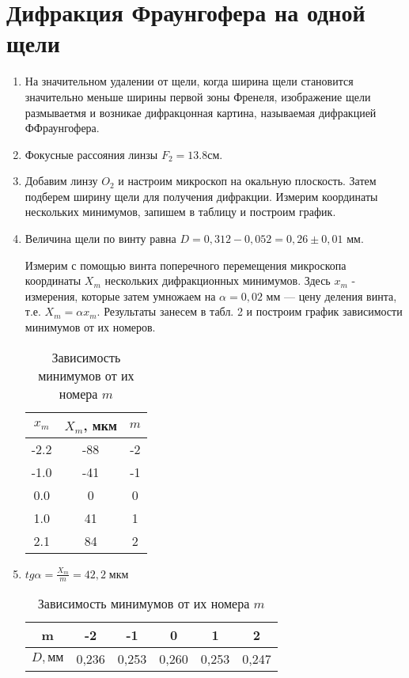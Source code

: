 \documentclass[a4paper]{article}
\begin{document}
\section{Дифракция Фраунгофера на одной щели}
\begin{enumerate}
	\item На значительном удалении от щели, когда ширина щели становится значительно меньше ширины первой зоны Френеля, изображение щели размываетмя и возникае дифракцонная картина, называемая дифракцией ФФраунгофера.
	\item Фокусные рассояния линзы $F_2 = 13.8 $см.
	\item Добавим линзу $O_2$ и настроим микроскоп на окальную плоскость. Затем подберем ширину щели для получения дифракции. Измерим координаты нескольких минимумов, запишем в таблицу и построим график.
	\item Величина щели по винту равна $ D = 0,312 - 0,052 = 0,26 \pm 0,01 $ мм.

Измерим с помощью винта поперечного перемещения микроскопа координаты $ X_m $ нескольких дифракционных минимумов. Здесь $ x_m $ - измерения, которые затем умножаем на $ \alpha = 0,02 $ мм --- цену деления винта, т.е. $ X_m = \alpha x_m $.
Результаты занесем в табл. 2 и построим график зависимости минимумов от их номеров. 

\begin{table}[h!]
	\caption{Зависимость минимумов от их номера $ m $}
	\begin{center}
		\begin{tabular}{|c|c|c|}
			\hline
			$ x_m $ & $ X_m $, мкм & $ m $ \\
			\hline
			-2.2 & -88 & -2 \\
			-1.0 & -41 & -1 \\
			0.0 & 0 & 0 \\
			1.0 & 41 & 1 \\
			2.1 & 84 & 2 \\
			\hline
		\end{tabular}
	\end{center}
	\label{}
\end{table}

\item $tg \alpha = \frac{X_m}{m} = 42,2 \; мкм$

\begin{table}[H]
	\caption{Зависимость минимумов от их номера $ m $}
	\begin{center}
		\begin{tabular}{|c|c|c|c|c|c|}
			\hline
			m & -2 & -1 & 0 & 1 & 2 \\
			\hline
			$ D, мм $ & 0,236 & 0,253 &0,260 & 0,253 & 0,247 \\
			\hline
		\end{tabular}
	\end{center}
	\label{}
\end{table}


\end{enumerate}
\end{document}
